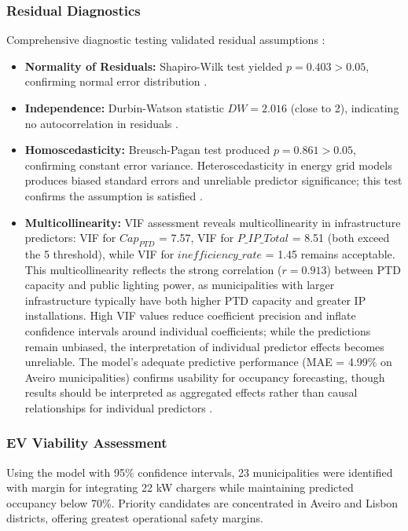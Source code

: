 \documentclass[conference]{IEEEtran}
\begin{document}
\subsubsection{Residual Diagnostics}
Comprehensive diagnostic testing validated residual assumptions \cite{Cohen2013}:
\begin{itemize}
\item \textbf{Normality of Residuals:} Shapiro-Wilk test yielded $p = 0.403 > 0.05$, confirming normal error distribution \cite{Xie2015}.
\item \textbf{Independence:} Durbin-Watson statistic $DW = 2.016$ (close to 2), indicating no autocorrelation in residuals \cite{Cohen2013}.
\item \textbf{Homoscedasticity:} Breusch-Pagan test produced $p = 0.861 > 0.05$, confirming constant error variance. Heteroscedasticity in energy grid models produces biased standard errors and unreliable predictor significance; this test confirms the assumption is satisfied \cite{Astivia2019}.
\item \textbf{Multicollinearity:} VIF assessment reveals multicollinearity in infrastructure predictors: VIF for $Cap_{PTD}$ = 7.57, VIF for $P\_IP\_Total$ = 8.51 (both exceed the 5 threshold), while VIF for $inefficiency\_rate$ = 1.45 remains acceptable. This multicollinearity reflects the strong correlation ($r = 0.913$) between PTD capacity and public lighting power, as municipalities with larger infrastructure typically have both higher PTD capacity and greater IP installations. High VIF values reduce coefficient precision and inflate confidence intervals around individual coefficients; while the predictions remain unbiased, the interpretation of individual predictor effects becomes unreliable. The model's adequate predictive performance (MAE = 4.99\% on Aveiro municipalities) confirms usability for occupancy forecasting, though results should be interpreted as aggregated effects rather than causal relationships for individual predictors \cite{Cohen2013}.
\end{itemize}

\subsubsection{EV Viability Assessment}
Using the model with 95\% confidence intervals, 23 municipalities were identified with margin for integrating 22 kW chargers while maintaining predicted occupancy below 70\%. Priority candidates are concentrated in Aveiro and Lisbon districts, offering greatest operational safety margins.
\end{document}
